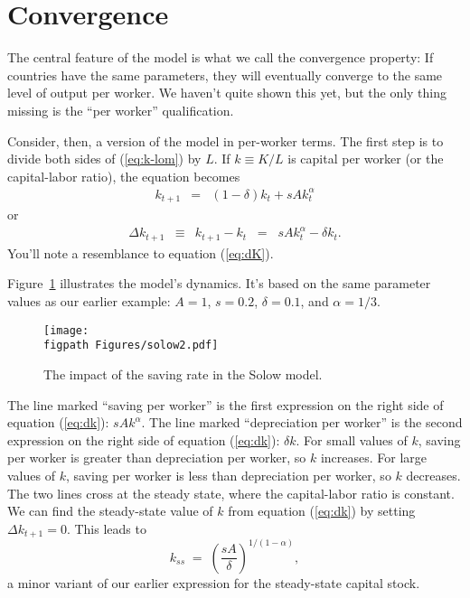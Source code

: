 \section{Convergence}

The central feature of the model is what we call the convergence property:
If countries have the same parameters, they will eventually converge to the same
level of output per worker.
We haven't quite shown this yet, but the only thing missing
is the ``per worker'' qualification.


Consider, then, a version of the model in per-worker terms.
The first step is to divide both sides of (\ref{eq:k-lom}) by $L$.
If $k \equiv K/L$ is capital per worker (or the capital-labor ratio), the equation becomes
\begin{eqnarray*}
   k_{t+1} &=& (1-\delta) k_t + s A k_{t}^{\alpha}
\end{eqnarray*}
or
\begin{eqnarray}
   \Delta k_{t+1} &\equiv& k_{t+1} - k_t
            \;\;=\;\; s A k_{t}^{\alpha} - \delta k_t  .
   \label{eq:dk}
\end{eqnarray}
You'll note a resemblance to equation (\ref{eq:dK}).

Figure~\ref{fig:solow2} illustrates the model's dynamics.
It's based on the same parameter values as our earlier example:
$ A = 1$, $s = 0.2$, $\delta = 0.1$, and $\alpha = 1/3$.
\begin{figure}[ht]
\caption{The impact of the saving rate in the Solow model.}
    \label{fig:solow2}
    \centering
    \texttt{[image: \\figpath Figures/solow2.pdf]}\\
\end{figure}
The line marked ``saving per worker'' is the first expression on
the right side of equation (\ref{eq:dk}):  $ s A k^\alpha $. The
line marked ``depreciation per worker'' is the second expression
on the right side of equation (\ref{eq:dk}):  $\delta k$. For
small values of $k$, saving per worker is greater than
depreciation per worker, so $k$ increases. For large values of
$k$, saving per worker is less than depreciation per worker, so
$k$ decreases. The two lines cross at the steady state, where the
capital-labor ratio is constant. We can find the steady-state
value of $k$ from equation (\ref{eq:dk}) by setting $\Delta
k_{t+1} = 0$.  This leads to
\[
    k_{ss} \;=\; \left( \frac{sA}{\delta} \right)^{1/(1-\alpha)} ,
\]
a minor variant of our earlier expression for the steady-state capital stock.


